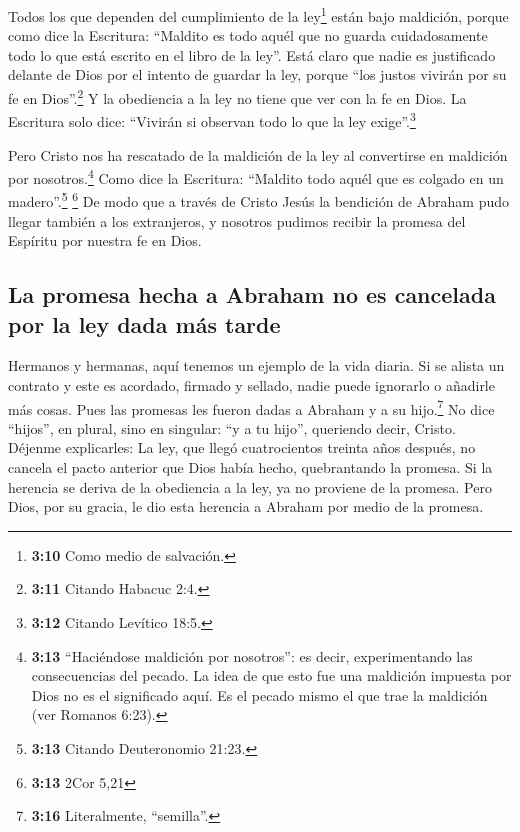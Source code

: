  Todos los que dependen del cumplimiento de la
ley\footnote{\textbf{3:10} Como medio de salvación.} están bajo
maldición, porque como dice la Escritura: ``Maldito es todo aquél que no
guarda cuidadosamente todo lo que está escrito en el libro de la ley''.
 Está claro que nadie es justificado delante de Dios por
el intento de guardar la ley, porque ``los justos vivirán por su fe en
Dios''.\footnote{\textbf{3:11} Citando Habacuc 2:4.}  Y
la obediencia a la ley no tiene que ver con la fe en Dios. La Escritura
solo dice: ``Vivirán si observan todo lo que la ley exige''.\footnote{\textbf{3:12}
  Citando Levítico 18:5.}

 Pero Cristo nos ha rescatado de la maldición de la ley
al convertirse en maldición por nosotros.\footnote{\textbf{3:13}
  ``Haciéndose maldición por nosotros'': es decir, experimentando las
  consecuencias del pecado. La idea de que esto fue una maldición
  impuesta por Dios no es el significado aquí. Es el pecado mismo el que
  trae la maldición (ver Romanos 6:23).} Como dice la Escritura:
``Maldito todo aquél que es colgado en un madero''.\footnote{\textbf{3:13}
  Citando Deuteronomio 21:23.} \footnote{\textbf{3:13} 2Cor 5,21}
 De modo que a través de Cristo Jesús la bendición de
Abraham pudo llegar también a los extranjeros, y nosotros pudimos
recibir la promesa del Espíritu por nuestra fe en Dios.

\hypertarget{la-promesa-hecha-a-abraham-no-es-cancelada-por-la-ley-dada-muxe1s-tarde}{%
\subsection{La promesa hecha a Abraham no es cancelada por la ley dada
más
tarde}\label{la-promesa-hecha-a-abraham-no-es-cancelada-por-la-ley-dada-muxe1s-tarde}}

 Hermanos y hermanas, aquí tenemos un ejemplo de la vida
diaria. Si se alista un contrato y este es acordado, firmado y sellado,
nadie puede ignorarlo o añadirle más cosas.  Pues las
promesas les fueron dadas a Abraham y a su hijo.\footnote{\textbf{3:16}
  Literalmente, ``semilla''.} No dice ``hijos'', en plural, sino en
singular: ``y a tu hijo'', queriendo decir, Cristo. 
Déjenme explicarles: La ley, que llegó cuatrocientos treinta años
después, no cancela el pacto anterior que Dios había hecho, quebrantando
la promesa.  Si la herencia se deriva de la obediencia a
la ley, ya no proviene de la promesa. Pero Dios, por su gracia, le dio
esta herencia a Abraham por medio de la promesa.

